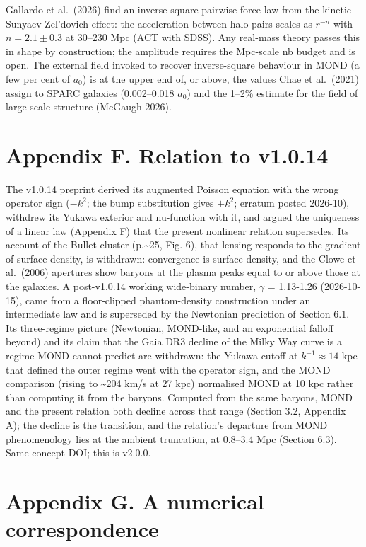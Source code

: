 \documentclass[
  10pt,
]{article}
\begin{document}
Gallardo et al.~(2026) find an inverse-square pairwise force law from the kinetic Sunyaev-Zel'dovich effect: the acceleration between halo pairs scales as $r^{-n}$ with $n=2.1\pm0.3$ at 30--230 Mpc (ACT with SDSS). Any real-mass theory passes this
in shape by construction; the amplitude requires the Mpc-scale nb budget
and is open. The external field invoked to recover inverse-square behaviour in MOND (a few per cent of $a_0$) is at the upper end of, or above, the values Chae et al.~(2021) assign to SPARC galaxies (0.002--0.018 $a_0$) and the 1--2\% estimate for the field of large-scale structure (McGaugh 2026).

\section{Appendix F. Relation to v1.0.14}\label{appendix-f.-relation-to-v1.0.14}

The v1.0.14 preprint derived its augmented Poisson equation with the
wrong operator sign ($-k^2$; the bump substitution gives $+k^2$;
erratum posted 2026-10), withdrew its Yukawa exterior and nu-function
with it, and argued the uniqueness of a linear law (Appendix F) that the
present nonlinear relation supersedes. Its account of the Bullet cluster
(p.\textasciitilde{}25, Fig. 6), that lensing responds to the gradient of surface
density, is withdrawn: convergence is surface density, and the Clowe et
al.~(2006) apertures show baryons at the plasma peaks equal to or above
those at the galaxies. A post-v1.0.14 working wide-binary number, $\gamma$
= 1.13-1.26 (2026-10-15), came from a floor-clipped phantom-density
construction under an intermediate law and is superseded by the
Newtonian prediction of Section 6.1. Its three-regime picture (Newtonian, MOND-like, and an exponential falloff beyond) and its claim that the Gaia DR3 decline of the Milky Way curve is a regime MOND cannot predict are withdrawn: the Yukawa cutoff at $k^{-1}\approx14$ kpc that defined the outer regime went with the operator sign, and the MOND comparison (rising to \textasciitilde{}204 km/s at 27 kpc) normalised MOND at 10 kpc rather than computing it from the baryons. Computed from the same baryons, MOND and the present relation both decline across that range (Section 3.2, Appendix A); the decline is the transition, and the relation's departure from MOND phenomenology lies at the ambient truncation, at 0.8--3.4 Mpc (Section 6.3). Same concept DOI; this is v2.0.0.

\section{Appendix G. A numerical correspondence}\label{appendix-g}
\end{document}
